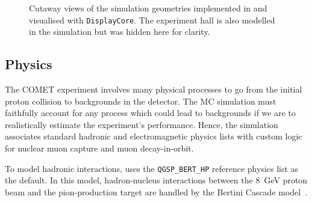 \begin{figure}
    \caption{Cutaway views of the simulation geometries implemented in \SimG and visualised with \texttt{DisplayCore}. The experiment hall is also modelled in the simulation but was hidden here for clarity.}
    \label{fig:comet_geometries}
\end{figure}




\subsection{Physics}
The COMET experiment involves many physical processes to go from the initial
proton collision to backgrounds in the detector. The MC simulation must
faithfully account for any process which could lead to backgrounds if we are to
realistically estimate the experiment's performance. Hence, the \SimG simulation
associates standard \Geant hadronic and electromagnetic physics lists with
custom logic for nuclear muon capture and muon decay-in-orbit.

To model hadronic interactions, \SimG uses the \texttt{QGSP\_BERT\_HP} reference physics list as the default. In this model, hadron-nucleus interactions between the \SI{8}{\GeV} proton beam and the pion-production target are handled by the Bertini Cascade model~\cite{WRIGHT2015175}.

